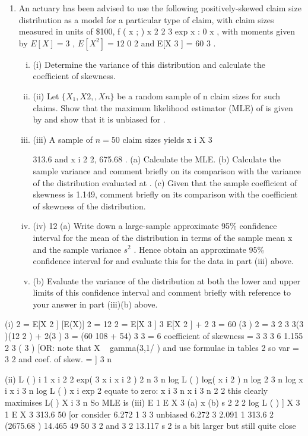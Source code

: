 \documentclass[a4paper,12pt]{article}
\begin{document}
\begin{enumerate}
\item An actuary has been advised to use the following positively-skewed claim size distribution as a model for a particular type of claim, with claim sizes measured in units of \$100,
f ( x ; )
x 2
2
3
exp
x
: 0
x
,
with moments given by $E[X] = 3$ , $E[X^2 ] = 12$
0
2
and E[X 3 ] = 60 3 .
\begin{enumerate}[(i)]
\item (i) Determine the variance of this distribution and calculate the coefficient of skewness.
\item  (ii) Let $\{X_1 , X 2 ,, X n\}$ be a random sample of n claim sizes for such claims. Show that the maximum likelihood estimator (MLE) of is given by
and show that it is unbiased for .
\item (iii)
A sample of $n = 50$ claim sizes yields x i
X
3

313.6 and x i 2
2, 675.68 .
(a) Calculate the MLE.
(b) Calculate the sample variance and comment briefly on its comparison with the variance of the distribution evaluated at .
(c) Given that the sample coefficient of skewness is 1.149, comment briefly on its comparison with the coefficient of skewness of the distribution.
%
\item (iv)
12
(a) Write down a large-sample approximate 95\% confidence interval for the mean of the distribution in terms of the sample mean x and the sample variance $s^2$ . Hence obtain an approximate 95\% confidence interval for and evaluate this for the data in part (iii) above.
\item 
(b) Evaluate the variance of the distribution at both the lower and upper limits of this confidence interval and comment briefly with reference to your answer in part (iii)(b) above.
\end{enumerate}
\end{enumerate}
\item (i)
2
= E[X 2 ]
[E(X)] 2 = 12
2
= E[X 3 ] 3 E[X 2 ] + 2
3
= 60
(3 ) 2 = 3
2
3
3(3 )(12 2 ) + 2(3 ) 3
= (60
108 + 54)
3
3
= 6
coefficient of skewness =
3
3
3
6
1.155
2 3
( 3
)
[OR: note that X ~ gamma(3,1/ ) and use formulae in tables
2
so var = 3 2 and coef. of skew. =
]
3
n
\item (ii)
L ( )
i 1
x i 2
2
exp(
3
x i
x i 2
)
2
n 3 n
log L ( ) log( x i 2 ) n log 2 3 n log
x i
x i
3 n
log L ( )
x i
exp
2
equate to zero:
x i
3 n
x i
3 n
2
2
this clearly maximises L( )
X i
3 n
So MLE is
(iii)
E 1
E X
3
(a) x
(b) s 2
2
2
log L ( ) ]
X
3
1
E X
3
313.6
50
[or consider
6.272
1
3
3
unbiased
6.272
3
2.091
1
313.6 2
(2675.68
) 14.465
49
50
3
2
and 3
2
13.117
s 2 is a bit larger but still quite close
\end{document}
